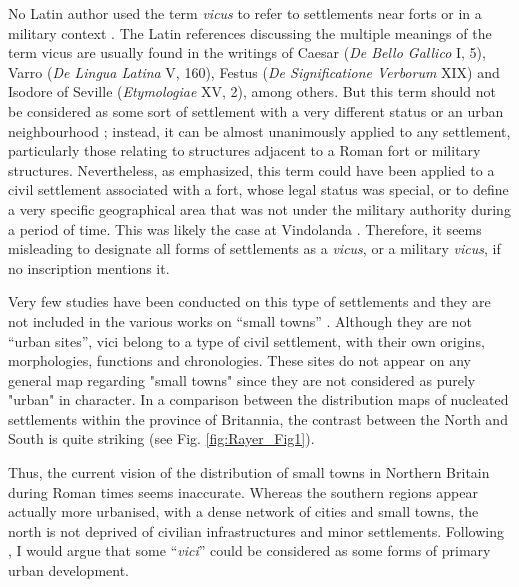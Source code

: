 No Latin author used the term \emph{vicus} to refer to settlements near forts or in a military context \parencites{Birley_2009}{Tarpin_2002}. The Latin references discussing the multiple meanings of the term vicus are usually found in the writings of Caesar (\emph{De Bello Gallico} I, 5), Varro (\emph{De Lingua Latina} V, 160), Festus (\emph{De Significatione Verborum} XIX) and Isodore of Seville (\emph{Etymologiae} XV, 2), among others. But this term should not be considered as some sort of settlement with a very different status or an urban neighbourhood \parencite[10]{Leveau_2002}; instead, it can be almost unanimously applied to any settlement, particularly those relating to structures adjacent to a Roman fort or military structures. Nevertheless, as \textcite[19]{Birley_2009} emphasized, this term could have been applied to a civil settlement associated with a fort, whose legal status was special, or to define a very specific geographical area that was not under the military authority during a period of time. This was likely the case at Vindolanda \parencite[1700]{RIB_1965}. Therefore, it seems misleading to designate all forms of settlements as a \emph{vicus}, or a military \emph{vicus}, if no inscription mentions it.

Very few studies have been conducted on this type of settlements and they are not included in the various works on “small towns” \parencites[e.g.][]{Jones_1990}{Todd_1970}{Wacher_1995}. Although they are not “urban sites”, vici belong to a type of civil settlement, with their own origins, morphologies, functions and chronologies. These sites do not appear on any general map regarding "small towns" \parencite[e.g.][156]{Jones_1990} since they are not considered as purely "urban" in character. In a comparison between the distribution maps of nucleated settlements within the province of Britannia, the contrast between the North and South is quite striking (see Fig. \ref{fig:Rayer_Fig1}).

Thus, the current vision of the distribution of small towns in Northern Britain during Roman times seems inaccurate. Whereas the southern regions appear actually more urbanised, with a dense network of cities and small towns, the north is not deprived of civilian infrastructures and minor settlements. Following \textcite[8]{Branigan_1980}, I would argue that some “\emph{vici}” could be considered as some forms of primary urban development.


